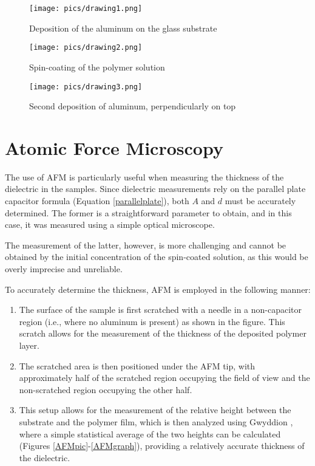 \begin{figure}[!htb]
  \texttt{[image: pics/drawing1.png]}
  \caption{Deposition of the aluminum on the glass substrate}\label{fig:drawing1}
  \label{draw1}
\endminipage\hfill
{}
  \texttt{[image: pics/drawing2.png]}
  \caption{Spin-coating of the polymer solution}\label{fig:drawing2}
  \label{draw2}
\endminipage\hfill
{}%
  \texttt{[image: pics/drawing3.png]}
  \caption{Second deposition of aluminum, perpendicularly on top}\label{fig:drawing3}
  \label{draw3}
\endminipage
\end{figure}

\section{Atomic Force Microscopy}

The use of \ac{AFM} is particularly useful when measuring the thickness of the dielectric in the samples.
%
%
Since dielectric measurements rely on the parallel plate capacitor formula (Equation \ref{parallelplate}), both $A$ and $d$ must be accurately determined. The former is a straightforward parameter to obtain, and in this case, it was measured using a simple optical microscope. %


The measurement of the latter, however, is more challenging and cannot be obtained by the initial concentration of the spin-coated solution, as this would be overly imprecise and unreliable.

To accurately determine the thickness, AFM is employed in the following manner:
\begin{enumerate}
    \item The surface of the sample is first scratched with a needle in a non-capacitor region (i.e., where no aluminum is present) as shown in the figure. This scratch allows for the measurement of the thickness of the deposited polymer layer. %
    \item The scratched area is then positioned under the AFM tip, with approximately half of the scratched region occupying the field of view and the non-scratched region occupying the other half.
    \item This setup allows for the measurement of the relative height between the substrate and the polymer film, which is then analyzed using Gwyddion \cite{gwyddion},
	    where a simple statistical average of the two heights can be calculated (Figures \ref{AFMpic}-\ref{AFMgraph}), providing a relatively accurate thickness of the dielectric.
\end{enumerate}

